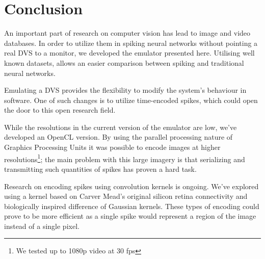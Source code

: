 \documentclass[twocolumn]{article}
\begin{document}
\section{Conclusion}

An important part of research on computer vision has lead to image and video databases. In order to utilize them in spiking neural networks without pointing a real DVS to a monitor, we developed the emulator presented here. Utilising well known datasets, allows an easier comparison between spiking and traditional neural networks.

Emulating a DVS provides the flexibility to modify the system's behaviour in software. One of such changes is to utilize time-encoded spikes, which could open the door to this open research field.

While the resolutions in the current version of the emulator are low, we've developed an OpenCL version. By using the parallel processing nature of Graphics Processing Units it was possible to encode images at higher resolutions\footnote{We tested up to 1080p video at 30 fps}; the main problem with this large imagery is that serializing and transmitting such quantities of spikes has proven a hard task.

Research on encoding spikes using convolution kernels is ongoing. We've explored using a kernel based on Carver Mead's original silicon retina connectivity and biologically inspired difference of Gaussian kernels. These types of encoding could prove to be more efficient as a single spike would represent a region of the image instead of a single pixel.

\printbibliography
\end{document}
